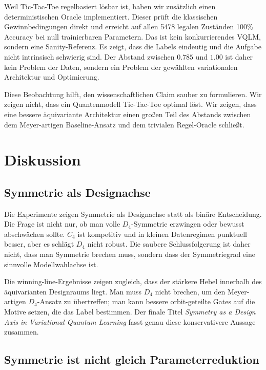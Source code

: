 Weil Tic-Tac-Toe regelbasiert lösbar ist, haben wir zusätzlich einen deterministischen Oracle implementiert. Dieser prüft die klassischen Gewinnbedingungen direkt und erreicht auf allen 5478 legalen Zuständen 100\% Accuracy bei null trainierbaren Parametern. Das ist kein konkurrierendes VQLM, sondern eine Sanity-Referenz. Es zeigt, dass die Labels eindeutig und die Aufgabe nicht intrinsisch schwierig sind. Der Abstand zwischen $0.785$ und $1.00$ ist daher kein Problem der Daten, sondern ein Problem der gewählten variationalen Architektur und Optimierung.

Diese Beobachtung hilft, den wissenschaftlichen Claim sauber zu formulieren. Wir zeigen nicht, dass ein Quantenmodell Tic-Tac-Toe optimal löst. Wir zeigen, dass eine bessere äquivariante Architektur einen großen Teil des Abstands zwischen dem Meyer-artigen Baseline-Ansatz und dem trivialen Regel-Oracle schließt.

\section{Diskussion}\label{sec:diskussion}

\subsection{Symmetrie als Designachse}\label{subsec:break}

Die Experimente zeigen Symmetrie als Designachse statt als binäre Entscheidung. Die Frage ist nicht nur, ob man volle $D_4$-Symmetrie erzwingen oder bewusst abschwächen sollte. $C_4$ ist kompetitiv und in kleinen Datenregimen punktuell besser, aber es schlägt $D_4$ nicht robust. Die saubere Schlussfolgerung ist daher nicht, dass man Symmetrie brechen muss, sondern dass der Symmetriegrad eine sinnvolle Modellwahlachse ist.

Die winning-line-Ergebnisse zeigen zugleich, dass der stärkere Hebel innerhalb des äquivarianten Designraums liegt. Man muss $D_4$ nicht brechen, um den Meyer-artigen $D_4$-Ansatz zu übertreffen; man kann bessere orbit-geteilte Gates auf die Motive setzen, die das Label bestimmen. Der finale Titel \emph{Symmetry as a Design Axis in Variational Quantum Learning} fasst genau diese konservativere Aussage zusammen.

\subsection{Symmetrie ist nicht gleich Parameterreduktion}\label{subsec:notparams}


